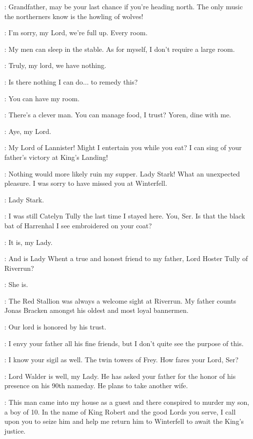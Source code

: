 \MARILLION: Grandfather, may be your last chance if you're heading north. The only music the northerners know is the howling of wolves! 


\MARSHAHEDDLE: I'm sorry, my Lord, we're full up. Every room. 

\TYRION: My men can sleep in the stable. As for myself, I don't require a large room. 

\MARSHAHEDDLE: Truly, my lord, we have nothing. 

\TYRION: Is there nothing I can do$\ldots$ to remedy this? 

\BRONN: You can have my room. 

\TYRION:  There's a clever man.  You can manage food, I trust? Yoren, dine with me. 

\BRONN: Aye, my Lord. 

\MARILLION: My Lord of Lannister! Might I entertain you while you eat? I can sing of your father's victory at King's Landing! 

\TYRION: Nothing would more likely ruin my supper. Lady Stark! What an unexpected pleasure. I was sorry to have missed you at Winterfell. 

\MARSHAHEDDLE: Lady Stark. 

\CATELYN:  I was still Catelyn Tully the last time I stayed here. You, Ser. Is that the black bat of Harrenhal I see embroidered on your coat? 

\KNIGHTa: It is, my Lady. 

\CATELYN: And is Lady Whent a true and honest friend to my father, Lord Hoster Tully of Riverrun? 

\KNIGHTa: She is. 

\CATELYN: The Red Stallion was always a welcome sight at Riverrun. My father counts Jonas Bracken amongst his oldest and most loyal bannermen. 

\KNIGHTb: Our lord is honored by his trust. 

\TYRION: I envy your father all his fine friends, but I don't quite see the purpose of this. 

\CATELYN: I know your sigil as well. The twin towers of Frey. How fares your Lord, Ser? 

\KNIGHTc: Lord Walder is well, my Lady. He has asked your father for the honor of his presence on his 90th nameday. He plans to take another wife. 

\CATELYN: This man came into my house as a guest and there conspired to murder my son, a boy of 10. In the name of King Robert and the good Lords you serve, I call upon you to seize him and help me return him to Winterfell to await the King's justice. 


